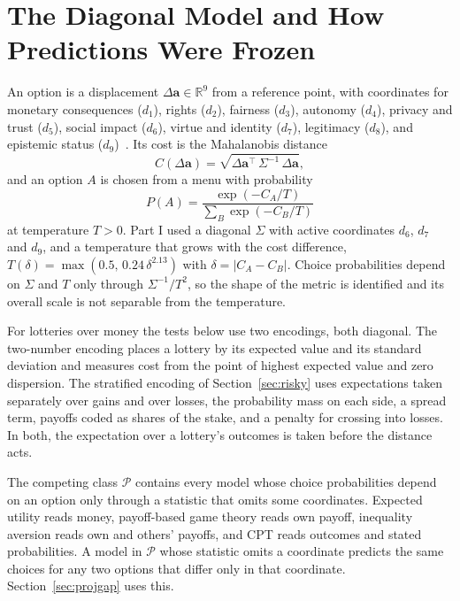 \documentclass[journal]{IEEEtran}
\newcommand{\Pclass}{\mathcal{P}}
\begin{document}
\section{The Diagonal Model and How Predictions Were Frozen}
\label{sec:recap}

An option is a displacement $\Delta\mathbf{a}\in\mathbb{R}^9$ from a reference point, with coordinates for monetary consequences ($d_1$), rights ($d_2$), fairness ($d_3$), autonomy ($d_4$), privacy and trust ($d_5$), social impact ($d_6$), virtue and identity ($d_7$), legitimacy ($d_8$), and epistemic status ($d_9$)~\cite{bond2026partI}.
Its cost is the Mahalanobis distance
\begin{equation}
    C(\Delta\mathbf{a}) = \sqrt{\Delta\mathbf{a}^{\top}\, \Sigma^{-1}\, \Delta\mathbf{a}},
    \label{eq:mahalanobis}
\end{equation}
and an option $A$ is chosen from a menu with probability
\begin{equation}
    P(A) = \frac{\exp(-C_A/T)}{\sum_{B}\exp(-C_B/T)}
    \label{eq:softmax}
\end{equation}
at temperature $T>0$.
Part I used a diagonal $\Sigma$ with active coordinates $d_6$, $d_7$ and $d_9$, and a temperature that grows with the cost difference, $T(\delta)=\max(0.5,\,0.24\,\delta^{2.13})$ with $\delta=|C_A-C_B|$.
Choice probabilities depend on $\Sigma$ and $T$ only through $\Sigma^{-1}/T^2$, so the shape of the metric is identified and its overall scale is not separable from the temperature.

For lotteries over money the tests below use two encodings, both diagonal.
The two-number encoding places a lottery by its expected value and its standard deviation and measures cost from the point of highest expected value and zero dispersion.
The stratified encoding of Section~\ref{sec:risky} uses expectations taken separately over gains and over losses, the probability mass on each side, a spread term, payoffs coded as shares of the stake, and a penalty for crossing into losses.
In both, the expectation over a lottery's outcomes is taken before the distance acts.

The competing class $\Pclass$ contains every model whose choice probabilities depend on an option only through a statistic that omits some coordinates.
Expected utility reads money, payoff-based game theory reads own payoff, inequality aversion reads own and others' payoffs, and CPT reads outcomes and stated probabilities.
A model in $\Pclass$ whose statistic omits a coordinate predicts the same choices for any two options that differ only in that coordinate.
Section~\ref{sec:projgap} uses this.
\end{document}
